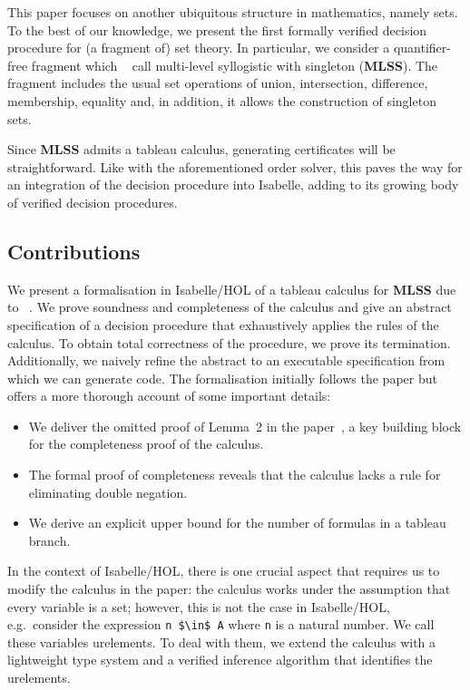\documentclass[runningheads]{llncs}
\newcommand{\MLSS}{\textbf{MLSS}}
\begin{document}
This paper focuses on another ubiquitous structure in mathematics, namely sets.
To the best of our knowledge, we present the first formally verified decision procedure for (a fragment of) set theory.
In particular, we consider a quantifier-free fragment which \citeauthor{new_fast_tableau}~\cite{new_fast_tableau} call multi-level syllogistic with singleton (\MLSS{}).
The fragment includes the usual set operations of union, intersection, difference, membership, equality and, in addition, it allows the construction of singleton sets.

Since \MLSS{} admits a tableau calculus, generating certificates will be straightforward.
Like with the aforementioned order solver, this paves the way for an integration of the decision procedure into Isabelle, adding to its growing body of verified decision procedures.

\subsection{Contributions}
We present a formalisation in Isabelle/HOL of a tableau calculus for \MLSS{} due to \citeauthor{new_fast_tableau}~\cite{new_fast_tableau}\cite[Chapter 14]{set_theory}.
We prove soundness and completeness of the calculus and give an abstract specification of a decision procedure that exhaustively applies the rules of the calculus.
To obtain total correctness of the procedure, we prove its termination.
Additionally, we naively refine the abstract to an executable specification from which we can generate code.
The formalisation initially follows the paper but offers a more thorough account of some important details:
\begin{itemize}
  \item We deliver the omitted proof of Lemma~2 in the paper~\cite{new_fast_tableau}, a key building block for the completeness proof of the calculus.
  \item The formal proof of completeness reveals that the calculus lacks a rule for eliminating double negation. 
  \item We derive an explicit upper bound for the number of formulas in a tableau branch.
\end{itemize}

In the context of Isabelle/HOL, there is one crucial aspect that requires us to modify the calculus in the paper:
the calculus works under the assumption that every variable is a set;
however, this is not the case in Isabelle/HOL, e.g.\ consider the expression \lstinline!n $\in$ A! where \lstinline!n! is a natural number.
We call these variables urelements.
To deal with them, we extend the calculus with a lightweight type system and a verified inference algorithm that identifies the urelements.
\end{document}
